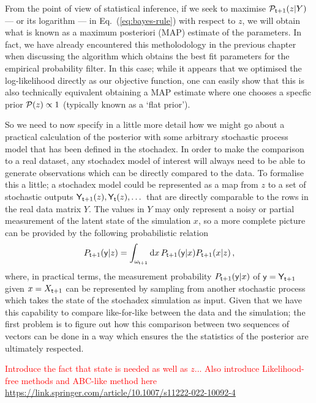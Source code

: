 From the point of view of statistical inference, if we seek to maximise ${\cal P}_{{\sf t}+1}(z \vert Y)$ --- or its logarithm --- in Eq.~(\ref{eq:bayes-rule}) with respect to $z$, we will obtain what is known as a maximum posteriori (MAP) estimate of the parameters. In fact, we have already encountered this metholodology in the previous chapter when discussing the algorithm which obtains the best fit parameters for the empirical probability filter. In this case; while it appears that we optimised the log-likelihood directly as our objective function, one can easily show that this is also technically equivalent obtaining a MAP estimate where one chooses a specfic prior ${\cal P} (z) \propto 1$ (typically known as a `flat prior').

So we need to now specify in a little more detail how we might go about a practical calculation of the posterior with some arbitrary stochastic process model that has been defined in the stochadex. In order to make the comparison to a real dataset, any stochadex model of interest will always need to be able to generate observations which can be directly compared to the data. To formalise this a little; a stochadex model could be represented as a map from $z$ to a set of stochastic outputs ${\sf Y}_{{\sf t}+1}(z), {\sf Y}_{{\sf t}}(z), \dots$ that are directly comparable to the rows in the real data matrix $Y$. The values in $Y$ may only represent a noisy or partial measurement of the latent state of the simulation $x$, so a more complete picture can be provided by the following probabilistic relation
\begin{align}
P_{{\sf t}+1}({\sf y} \vert z) = \int_{\omega_{{\sf t}+1}}{\rm d}x\, P_{{\sf t}+1}({\sf y} \vert x)P_{{\sf t}+1}(x\vert z) \,,
\end{align}
where, in practical terms, the measurement probability $P_{{\sf t}+1}({\sf y} \vert x)$ of ${\sf y}={\sf Y}_{{\sf t}+1}$ given $x=X_{{\sf t}+1}$ can be represented by sampling from another stochastic process which takes the state of the stochadex simulation as input. Given that we have this capability to compare like-for-like between the data and the simulation; the first problem is to figure out how this comparison between two sequences of vectors can be done in a way which ensures the the statistics of the posterior are ultimately respected. 

\textcolor{red}{Introduce the fact that state is needed as well as $z$... Also introduce Likelihood-free methods and ABC-like method here \url{https://link.springer.com/article/10.1007/s11222-022-10092-4}}

